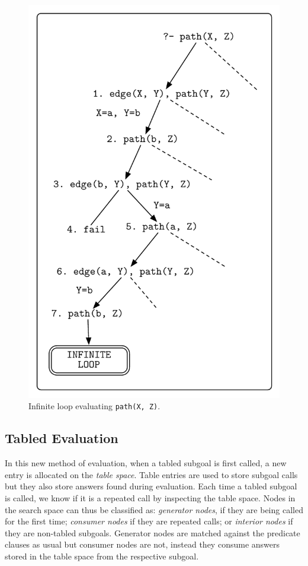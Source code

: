 \begin{figure}[ht]
  \centering
    \includegraphics[scale=0.6]{infinite_loop.pdf}
  \caption{Infinite loop evaluating \texttt{path(X, Z)}.}
  \label{fig:infinite_loop}
\end{figure}

\subsection{Tabled Evaluation}

In this new method of evaluation, when a tabled subgoal is first called, a new entry is allocated on the \textit{table space}. Table
entries are used to store subgoal calls but they also store answers found during evaluation. Each time a tabled subgoal is called, we
know if it is a repeated call by inspecting the table space. Nodes in the search space can thus be classified as:
\textit{generator nodes}, if they are being called for the first time; \textit{consumer nodes} if they are repeated calls;
or \textit{interior nodes} if they are non-tabled subgoals. Generator nodes are matched against the predicate clauses as usual but
consumer nodes are not, instead they consume answers stored in the table space from the respective subgoal.

